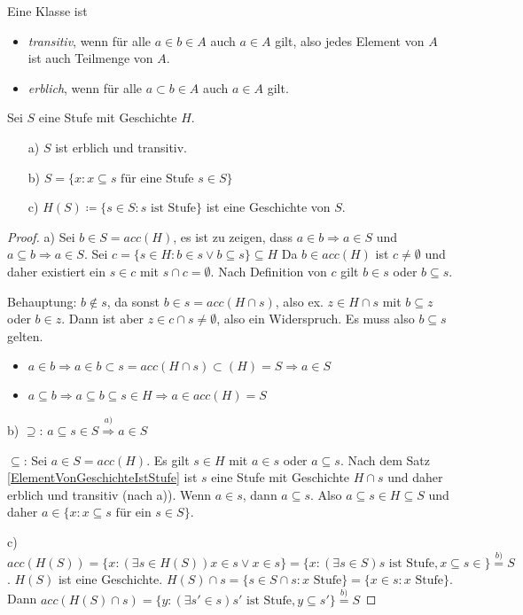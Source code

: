 \begin{definition} 
	Eine Klasse ist
	\begin{itemize}
		\item \textit{transitiv}, wenn für alle $a\in b\in A$ auch $a\in A$ gilt, also jedes Element von $A$ ist auch Teilmenge von $A$.
		\item \textit{erblich}, wenn für alle $a\subset b \in A$ auch $a\in A$ gilt.
	\end{itemize}
\end{definition}

\begin{satz}
	Sei $S$ eine Stufe mit Geschichte $H$.
	\begin{itemize}
		\item[a)] $S$ ist erblich und transitiv.
		\item[b)] $S=\{x : x\subseteq s \text{ für eine Stufe } s\in S\}$
		\item[c)] $H(S)\coloneqq\{s\in S : s\text{ ist Stufe}\}$ ist eine Geschichte von $S$.
	\end{itemize}
\end{satz}
\begin{proof}
	a) Sei $b\in S=acc(H)$, es ist zu zeigen, dass $a\in b\Rightarrow a\in S$ und $a\subseteq b \Rightarrow a\in S$. Sei $c=\{s\in H : b\in s \lor b \subseteq s\}\subseteq H$ Da $b\in acc(H)$ ist $c\neq \emptyset$ und daher existiert ein $s\in c$ mit $s\cap c=\emptyset$. Nach Definition von $c$ gilt $b\in s$ oder $b\subseteq s$. 
	
	Behauptung: $b\notin s$, da sonst $b\in s = acc(H\cap s)$, also ex. $z\in H\cap s$ mit $b\subseteq z$ oder $b\in z$. Dann ist aber $z\in c\cap s\neq \emptyset$, also ein Widerspruch. Es muss also $b\subseteq s$ gelten. 
	\begin{itemize}
		\item $a\in b \Rightarrow a \in b \subset s=acc(H\cap s)\subset(H)=S\Rightarrow a\in S$
		\item $a\subseteq b\Rightarrow a\subseteq b \subseteq s\in H \Rightarrow a\in acc(H)=S$
	\end{itemize}

	b) \glqq$\supseteq$\grqq: $a\subseteq s \in S\stackrel{a)}{\Rightarrow}a\in S$
	
	\glqq$\subseteq$\grqq{}: Sei $a\in S=acc(H)$. Es gilt $s\in H$ mit $a\in s$ oder $a\subseteq s$. Nach dem Satz \ref{ElementVonGeschichteIstStufe} ist $s$ eine Stufe mit Geschichte $H\cap s$ und daher erblich und transitiv (nach a)). Wenn $a\in s$, dann $a\subseteq s$. Also $a\subseteq s\in H\subseteq S$ und daher $a\in\{x : x\subseteq s \text{ für ein } s\in S\}$.
	
	c) $acc(H(S))=\{x : (\exists s\in H(S)) x\in s \lor x\in s\} = \{x : (\exists s \in S) s \text{ ist Stufe}, x\subseteq s\in\}\stackrel{b)}{=}S$. $H(S)$ ist eine Geschichte. $H(S)\cap s=\{s\in S\cap s : x \text{ Stufe}\}=\{x\in s : x \text{ Stufe}\}$. Dann $acc(H(S)\cap s)=\{y : (\exists s'\in s) s' \text{ ist Stufe}, y\subseteq s'\}\stackrel{b)}{=}S$
 \end{proof}

